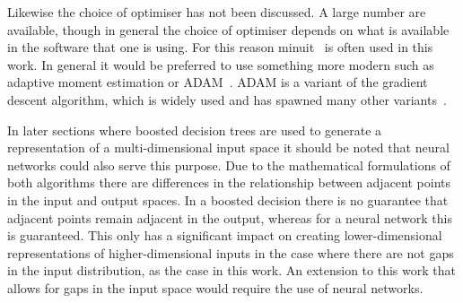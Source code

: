 Likewise the choice of optimiser has not been discussed. A large number are
available, though in general the choice of optimiser depends on what is available
in the software that one is using. For this reason minuit~\cite{minuit} is often
used in this work. In general it would be preferred to use something more
modern such as adaptive moment estimation or ADAM~\cite{ADAMOpt}. ADAM is a
variant of the gradient descent algorithm, which is widely used and has spawned
many other variants~\cite{GDOverview}.

In later sections where boosted decision trees are used to generate a
representation of a multi-dimensional input space it should be noted that neural
networks could also serve this purpose. Due to the mathematical formulations of
both algorithms there are differences in the relationship between adjacent
points in the input and output spaces. In a boosted decision there is no
guarantee that adjacent points remain adjacent in the output, whereas for a
neural network this is guaranteed. This only has a significant impact on creating
lower-dimensional representations of higher-dimensional inputs in the case where
there are not gaps in the input distribution, as the case in this work. An
extension to this work that allows for gaps in the input space would require the
use of neural networks.